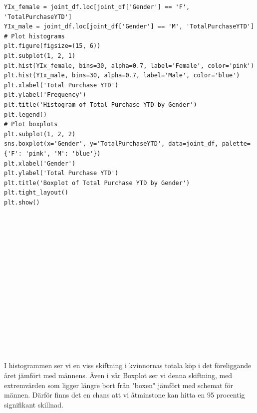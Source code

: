 \documentclass[]{article}
\begin{document}
\begin{lstlisting}
YIx_female = joint_df.loc[joint_df['Gender'] == 'F', 'TotalPurchaseYTD']
YIx_male = joint_df.loc[joint_df['Gender'] == 'M', 'TotalPurchaseYTD']
# Plot histograms
plt.figure(figsize=(15, 6))
plt.subplot(1, 2, 1)
plt.hist(YIx_female, bins=30, alpha=0.7, label='Female', color='pink')
plt.hist(YIx_male, bins=30, alpha=0.7, label='Male', color='blue')
plt.xlabel('Total Purchase YTD')
plt.ylabel('Frequency')
plt.title('Histogram of Total Purchase YTD by Gender')
plt.legend()
# Plot boxplots
plt.subplot(1, 2, 2)
sns.boxplot(x='Gender', y='TotalPurchaseYTD', data=joint_df, palette={'F': 'pink', 'M': 'blue'})
plt.xlabel('Gender')
plt.ylabel('Total Purchase YTD')
plt.title('Boxplot of Total Purchase YTD by Gender')
plt.tight_layout()
plt.show()
\end{lstlisting}
\\\\\\\\\\\\\\\\\\\\\\\\\\\\\\
I histogrammen ser vi en viss skiftning i kvinnornas totala köp i det föreliggande året jämfört med männens. Även i vår Boxplot ser vi denna skiftning, med extremvärden som ligger längre bort från "boxen" jämfört med schemat för männen. Därför finns det en chans att vi åtminstone kan hitta en 95 procentig signifikant skillnad.
\end{document}
